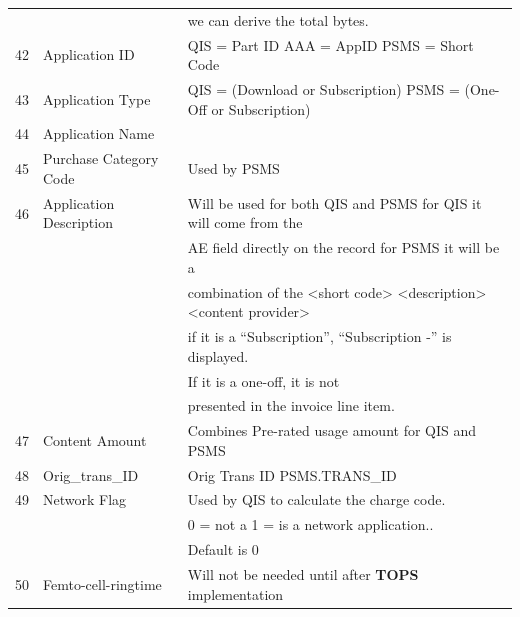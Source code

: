\documentclass[12pt,twoside]{article}
\begin{document}
\begin{longtable}{cll}
                 &                           &  we can derive the total bytes.                                         \\
             42  &  Application ID           &  QIS = Part ID AAA = AppID PSMS = Short Code                            \\
             43  &  Application Type         &  QIS = (Download or Subscription) PSMS = (One-Off or Subscription)      \\
             44  &  Application Name         &                                                                         \\
             45  &  Purchase Category Code   &  Used by PSMS                                                           \\
             46  &  Application Description  &  Will be used for both QIS and PSMS for QIS it will come from the       \\
                 &                           &  AE field directly on the record for PSMS it will be a                  \\
                 &                           &  combination of the <short code> <description> <content provider>       \\
                 &                           &  if it is a ``Subscription'', ``Subscription -'' is displayed.          \\
                 &                           &  If it is a one-off, it is not                                          \\
                 &                           &  presented in the invoice line item.                                    \\
             47  &  Content Amount           &  Combines Pre-rated usage amount for QIS and PSMS                       \\
             48  &  Orig\_trans\_ID          &  Orig Trans ID PSMS.TRANS\_ID                                           \\
             49  &  Network Flag             &  Used by QIS to calculate the charge code.                              \\
                 &                           &  0 = not a 1 = is a network application..                               \\
                 &                           &  Default is 0                                                           \\
             50  &  Femto-cell-ringtime      &  Will not be needed until after \textbf{TOPS} implementation            \\

\end{longtable}
\end{document}
